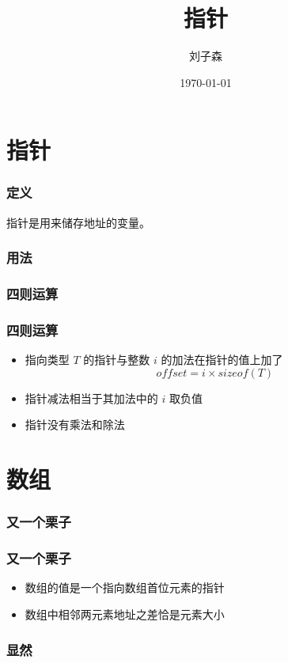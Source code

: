 \documentclass{beamer}
\author{刘子森}
\title{指针}
\date{\today}
\institute{四川大学软件学院}
\begin{document}
\frame{\titlepage}

\begin{frame}
 \tableofcontents
\end{frame}

\section{指针}

\begin{frame}
 \frametitle{定义}
 指针是用来储存地址的变量。
\end{frame}

\begin{frame}
 \frametitle{用法}
 
\end{frame}

\begin{frame}
 \frametitle{四则运算}
 
\end{frame}

\begin{frame}
 \frametitle{四则运算}
 \begin{itemize}
  \item 指向类型 \(T\) 的指针与整数 \(i\) 的加法在指针的值上加了
        \[offset = i \times sizeof(T)\]
  \item 指针减法相当于其加法中的 \(i\) 取负值
  \item 指针没有乘法和除法
 \end{itemize}
\end{frame}

\section{数组}
\begin{frame}
 \frametitle{又一个栗子}
 
\end{frame}

\begin{frame}
 \frametitle{又一个栗子}
 \begin{itemize}
  \item 数组的值是一个指向数组首位元素的指针
  \item 数组中相邻两元素地址之差恰是元素大小
 \end{itemize}
\end{frame}

\begin{frame}

 \frametitle{显然}
 
\end{frame}
\end{document}
